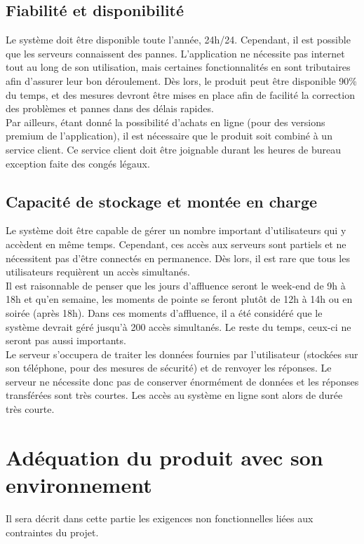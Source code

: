 \subsection*{Fiabilité et disponibilité}
Le système doit être disponible toute l'année, 24h/24. Cependant, il est possible que les serveurs connaissent des pannes. L'application ne nécessite pas internet tout au long de son utilisation, mais certaines fonctionnalités en sont tributaires afin d'assurer leur bon déroulement. Dès lors, le produit peut être disponible 90\% du temps, et des mesures devront être mises en place afin de facilité la correction des problèmes et pannes dans des délais rapides.\\

Par ailleurs, étant donné la possibilité d'achats en ligne (pour des versions premium de l'application), il est nécessaire que le produit soit combiné à un service client. Ce service client doit être joignable durant les heures de bureau exception faite des congés légaux.


\subsection*{Capacité de stockage et montée en charge}
Le système doit être capable de gérer un nombre important d'utilisateurs qui y accèdent en même temps. Cependant, ces accès aux serveurs sont partiels et ne nécessitent pas d'être connectés en permanence. Dès lors, il est rare que tous les utilisateurs requièrent un accès simultanés.\\

Il est raisonnable de penser que les jours d'affluence seront le week-end de 9h à 18h et qu'en semaine, les moments de pointe se feront plutôt de 12h à 14h ou en soirée (après 18h). Dans ces moments d'affluence, il a été considéré que le système devrait géré jusqu'à 200 accès simultanés. Le reste du temps, ceux-ci ne seront pas aussi importants.\\

Le serveur s'occupera de traiter les données fournies par l'utilisateur (stockées sur son téléphone, pour des mesures de sécurité) et de renvoyer les réponses. Le serveur ne nécessite donc pas de conserver énormément de données et les réponses transférées sont très courtes. Les accès au système en ligne sont alors de durée très courte.

\section{Adéquation du produit avec son environnement}
Il sera décrit dans cette partie les exigences non fonctionnelles liées aux contraintes du projet.

